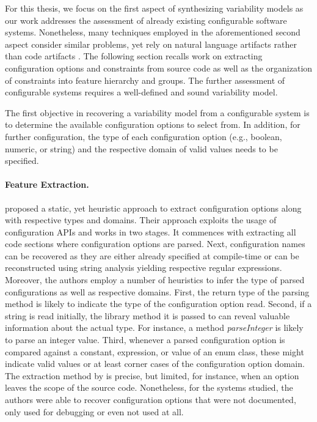 For this thesis, we focus on the first aspect of synthesizing variability
models as our work addresses the assessment of already existing configurable
software systems. Nonetheless, many techniques employed in the aforementioned
second aspect consider similar problems, yet rely on natural language artifacts
rather than code artifacts \citep{alves_exploratory_2008,bakar_feature_2015}.
The following section recalls work on extracting configuration options and
constraints from source code as well as the organization of constraints into
feature hierarchy and groups. The further assessment of configurable systems
requires a well-defined and sound variability model.

The first objective in recovering a variability model from a configurable
system is to determine the available configuration options to select
from. In addition, for further configuration, the type of each configuration
option (e.g., boolean, numeric, or string) and the respective domain of valid
values needs to be specified.

\paragraph{Feature Extraction.} \cite{rabkin_static_2011} proposed a static, yet
heuristic approach to extract configuration options along with respective types and domains. Their approach
exploits the usage of configuration APIs and works
in two stages. It commences with extracting all code sections where
configuration options are parsed. Next, configuration names can be
recovered as they are either already specified at compile-time or can be
reconstructed using string analysis yielding respective regular expressions.
Moreover, the authors employ a number of heuristics to infer the type of parsed
configurations as well as respective domains. First, the return type of the
parsing method is likely to indicate the type of the configuration option read.
Second, if a string is read initially, the library method it is passed to can
reveal valuable information about the actual type. For instance, a method
\emph{parseInteger} is likely to parse an integer value. Third, whenever a
parsed configuration option is compared against a constant, expression, or value
of an enum class, these might indicate valid values or at least corner cases of
the configuration option domain. The extraction method by
\cite{rabkin_static_2011} is precise, but limited, for instance, when an
option leaves the scope of the source code.
Nonetheless, for the systems studied, the authors were able to recover
configuration options that were not documented, only used for debugging or even not used at
all.

